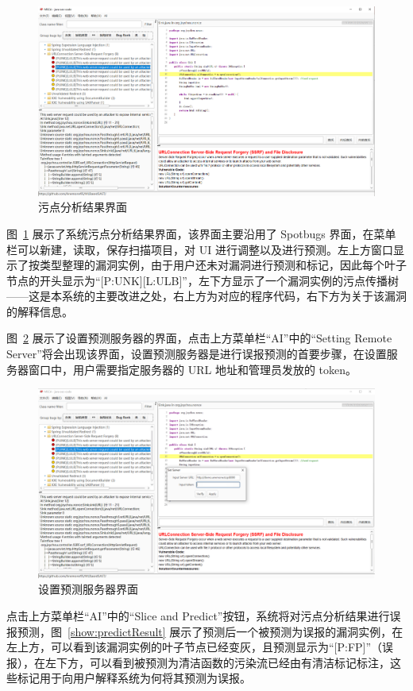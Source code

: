 \begin{figure}[H]
    \centering
    \includegraphics[width=0.8\linewidth]{FIGs/chapter4/taintAnalysis.png}
    \caption{污点分析结果界面}\label{show:taint}
\end{figure} 

图~\ref{show:taint} 展示了系统污点分析结果界面，该界面主要沿用了 Spotbugs 界面，在菜单栏可以新建，读取，保存扫描项目，对 UI 进行调整以及进行预测。左上方窗口显示了按类型整理的漏洞实例，由于用户还未对漏洞进行预测和标记，因此每个叶子节点的开头显示为“[P:UNK][L:ULB]”，左下方显示了一个漏洞实例的污点传播树——这是本系统的主要改进之处，右上方为对应的程序代码，右下方为关于该漏洞的解释信息。

图~\ref{show:settingServer} 展示了设置预测服务器的界面，点击上方菜单栏“AI”中的“Setting Remote Server”将会出现该界面，设置预测服务器是进行误报预测的首要步骤，在设置服务器窗口中，用户需要指定服务器的 URL 地址和管理员发放的 token。

 \begin{figure}[H]
     \centering
     \includegraphics[width=0.8\linewidth]{FIGs/chapter4/settingServer.png}
     \caption{设置预测服务器界面}\label{show:settingServer}
 \end{figure} 

点击上方菜单栏“AI”中的“Slice and Predict”按钮，系统将对污点分析结果进行误报预测，图~\ref{show:predictResult} 展示了预测后一个被预测为误报的漏洞实例，在左上方，可以看到该漏洞实例的叶子节点已经变灰，且预测显示为“[P:FP]”（误报），在左下方，可以看到被预测为清洁函数的污染流已经由有清洁标记标注，这些标记用于向用户解释系统为何将其预测为误报。


